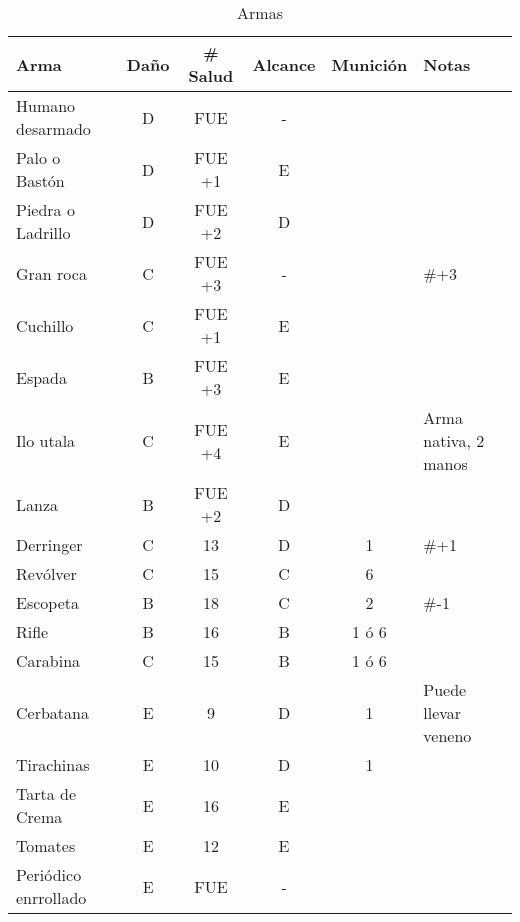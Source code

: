 \begin{table}[ht]
\begin{tabular}{lccccl}
\toprule
Arma               & Daño       & \# Salud  & Alcance   & Munición  & Notas             \\\midrule\midrule
Humano desarmado   & D          & FUE       & -         &           &                   \\\midrule
Palo o Bastón      & D          & FUE +1    & E         &           &                   \\\midrule
Piedra o Ladrillo  & D          & FUE +2    & D         &           &                   \\\midrule
Gran roca          & C          & FUE +3    & -         &           & \#+3              \\\midrule
Cuchillo           & C          & FUE +1    & E         &           &                   \\\midrule
Espada             & B          & FUE +3    & E         &           &                   \\\midrule
Ilo utala          & C          & FUE +4    & E         &           & Arma nativa, 2 manos       \\\midrule
Lanza              & B          & FUE +2    & D         &           &                    \\\midrule
Derringer          & C          & 13        & D         & 1         & \#+1              \\\midrule
Revólver           & C          & 15        & C         & 6         &                   \\\midrule
Escopeta           & B          & 18        & C         & 2         & \#-1              \\\midrule
Rifle              & B          & 16        & B         & 1 ó 6     &                   \\\midrule
Carabina           & C          & 15        & B         & 1 ó 6     &                    \\\midrule
Cerbatana          & E          & 9         & D         & 1         & Puede llevar veneno \\\midrule
Tirachinas         & E          & 10        & D         & 1         &                   \\\midrule
Tarta de Crema     & E          & 16        & E         &           &                   \\\midrule
Tomates            & E          & 12        & E         &           & \\\midrule
Periódico enrrollado & E        & FUE       & -         &           & \\\midrule
\bottomrule
\end{tabular}
\caption{Armas}
\end{table}

